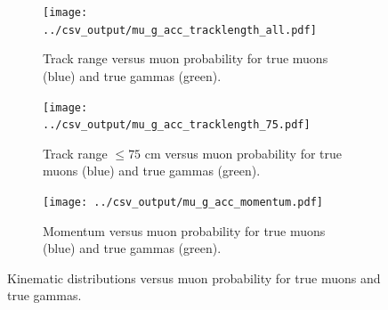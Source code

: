 \begin{figure}[htp]
\centering
	\begin{subfigure}[b]{.475\textwidth}
		\centering
		\texttt{[image: ../csv\_output/mu\_g\_acc\_tracklength\_all.pdf]}
		\caption{Track range versus muon probability for true muons (blue) and true gammas (green).}
		\label{fig:mup_tracklength}
	\end{subfigure}
	\begin{subfigure}[b]{.475\textwidth}
		\centering
		\texttt{[image: ../csv\_output/mu\_g\_acc\_tracklength\_75.pdf]}
		\caption{Track range $\leq 75$ cm versus muon probability for true muons (blue) and true gammas (green).}
		\label{fig:mup_tracklength75}
	\end{subfigure}
	\begin{subfigure}[b]{.475\textwidth}
		\centering
		\texttt{[image: ../csv\_output/mu\_g\_acc\_momentum.pdf]}
		\caption{Momentum versus muon probability for true muons (blue) and true gammas (green).}
		\label{fig:mup_momentum}
	\end{subfigure}
\caption{Kinematic distributions versus muon probability for true muons and true gammas.}
\label{fig:mug_kinematics}
\end{figure}



